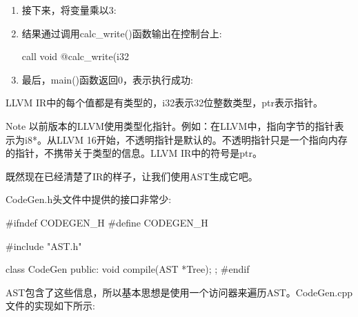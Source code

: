 \begin{enumerate}
\item
接下来，将变量乘以3:

\begin{shell}
\end{shell}

\item
结果通过调用calc\_write()函数输出在控制台上:

\begin{shell}
    call void @calc_write(i32 %
\end{shell}

\item
最后，main()函数返回0，表示执行成功:

\begin{shell}
    ret i32 0
}
\end{shell}

\end{enumerate}

LLVM IR中的每个值都是有类型的，i32表示32位整数类型，ptr表示指针。

\begin{myNotic}{Note}
以前版本的LLVM使用类型化指针。例如：在LLVM中，指向字节的指针表示为i8*。从LLVM 16开始，不透明指针是默认的。不透明指针只是一个指向内存的指针，不携带关于类型的信息。LLVM IR中的符号是ptr。
\end{myNotic}

既然现在已经清楚了IR的样子，让我们使用AST生成它吧。


CodeGen.h头文件中提供的接口非常少:

\begin{cpp}
#ifndef CODEGEN_H
#define CODEGEN_H

#include "AST.h"

class CodeGen
{
    public:
    void compile(AST *Tree);
};
#endif
\end{cpp}

AST包含了这些信息，所以基本思想是使用一个访问器来遍历AST。CodeGen.cpp文件的实现如下所示:

